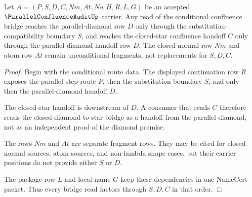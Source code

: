 \begin{theorem}
\label{thm:parallel-confluence-audit-conditional-bridge}
Let $A=(P,S,D,C,Nm,At,No,H,R,L,G)$ be an accepted $\ParallelConfluenceAuditUp$ carrier. Any read of the conditional confluence bridge reaches the parallel-diamond row $D$ only through the substitution-compatibility boundary $S$, and reaches the closed-star confluence handoff $C$ only through the parallel-diamond handoff row $D$. The closed-normal row $Nm$ and atom row $At$ remain unconditional fragments, not replacements for $S,D,C$.
\end{theorem}
\begin{proof}
Begin with the conditional route data. The displayed continuation row $R$ exposes the parallel-step route $P$, then the substitution boundary $S$, and only then the parallel-diamond handoff $D$.

The closed-star handoff is downstream of $D$. A consumer that reads $C$ therefore reads the closed-diamond-to-star bridge as a handoff from the parallel diamond, not as an independent proof of the diamond premise.

The rows $Nm$ and $At$ are separate fragment rows. They may be cited for closed-normal sources, atom sources, and non-lambda shape cases, but their carrier positions do not provide either $S$ or $D$.

The package row $L$ and local name $G$ keep these dependencies in one NameCert packet. Thus every bridge read factors through $S,D,C$ in that order.
\end{proof}

